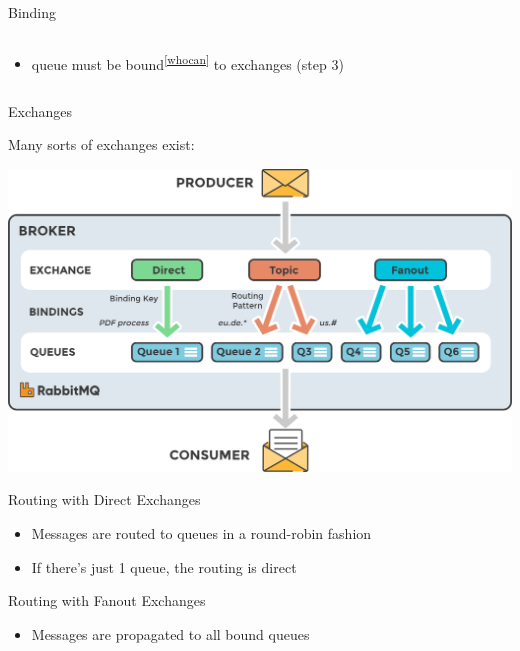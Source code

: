 \documentclass{beamer}\mode<presentation>{\usetheme{AMSBolognaFC}}
\begin{document}
\begin{frame}{Binding}
\begin{columns}
\begin{column}{.5\linewidth}
\begin{itemize}
                \medskip

                \item queue must be \alert{bound}\textsuperscript{\ref{whocan}} to exchanges (step 3)
            \end{itemize}
        \end{column}
    \end{columns}


\end{frame}

\begin{frame}{Exchanges}

    Many sorts of exchanges exist:
    \begin{center}
        \includegraphics[width=.8\linewidth]{img/exchanges.png}
    \end{center}

\end{frame}

\begin{frame}{Routing with Direct Exchanges}

    \begin{itemize}
        \item Messages are routed to queues in a \alert{round-robin} fashion

        \bigskip

        \item If there's just 1 queue, the routing is \alert{direct}
    \end{itemize}

\end{frame}

\begin{frame}{Routing with Fanout Exchanges}

    \begin{itemize}
        \item Messages are propagated to all bound queues
    \end{itemize}

\end{frame}
\end{document}
